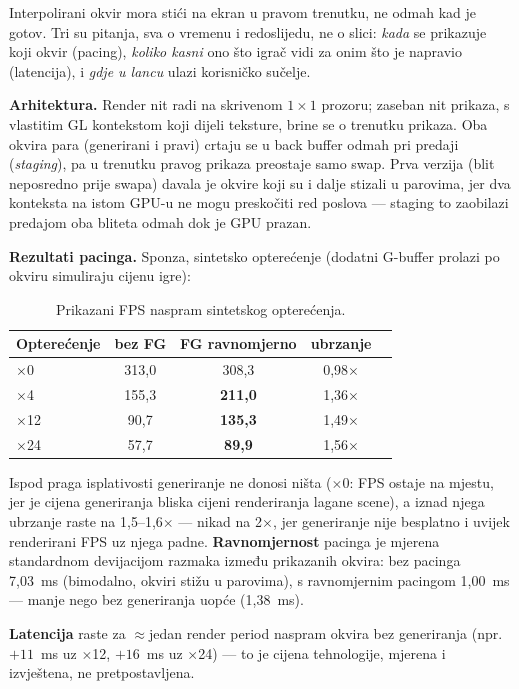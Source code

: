 \documentclass{mathos}
\begin{document}
Interpolirani okvir mora stići na ekran u pravom trenutku, ne odmah kad je
gotov. Tri su pitanja, sva o vremenu i redoslijedu, ne o slici: \emph{kada}
se prikazuje koji okvir (pacing), \emph{koliko kasni} ono što igrač vidi za
onim što je napravio (latencija), i \emph{gdje u lancu} ulazi korisničko
sučelje.

\textbf{Arhitektura.} Render nit radi na skrivenom $1\times1$ prozoru;
zaseban nit prikaza, s vlastitim GL kontekstom koji dijeli teksture, brine se
o trenutku prikaza. Oba okvira para (generirani i pravi) crtaju se u
back buffer odmah pri predaji (\emph{staging}), pa u trenutku pravog prikaza
preostaje samo swap. Prva verzija (blit neposredno prije swapa) davala je
okvire koji su i dalje stizali u parovima, jer dva konteksta na istom GPU-u
ne mogu preskočiti red poslova — staging to zaobilazi predajom oba bliteta
odmah dok je GPU prazan.

\textbf{Rezultati pacinga.} Sponza, sintetsko opterećenje (dodatni G-buffer
prolazi po okviru simuliraju cijenu igre):

\begin{table}[hbtp]
\centering
\begin{tabular}{|l|c|c|c|c|}\hline
Opterećenje & bez FG & FG ravnomjerno & ubrzanje \\\hline
$\times$0 & 313,0 & 308,3 & 0,98$\times$ \\\hline
$\times$4 & 155,3 & \textbf{211,0} & 1,36$\times$ \\\hline
$\times$12 & 90,7 & \textbf{135,3} & 1,49$\times$ \\\hline
$\times$24 & 57,7 & \textbf{89,9} & 1,56$\times$ \\\hline
\end{tabular}
\caption{Prikazani FPS naspram sintetskog opterećenja.}
\label{table_m8_fps}
\end{table}

Ispod praga isplativosti generiranje ne donosi ništa ($\times$0: FPS ostaje
na mjestu, jer je cijena generiranja bliska cijeni renderiranja lagane
scene), a iznad njega ubrzanje raste na 1,5--1,6$\times$ — nikad na
2$\times$, jer generiranje nije besplatno i uvijek renderirani FPS uz njega
padne. \textbf{Ravnomjernost} pacinga je mjerena standardnom devijacijom
razmaka između prikazanih okvira: bez pacinga 7,03~ms (bimodalno, okviri
stižu u parovima), s ravnomjernim pacingom 1,00~ms — manje nego bez
generiranja uopće (1,38~ms).

\textbf{Latencija} raste za $\approx$jedan render period naspram okvira bez
generiranja (npr. $+11$~ms uz $\times$12, $+16$~ms uz $\times$24) — to je
cijena tehnologije, mjerena i izvještena, ne pretpostavljena.
\end{document}
